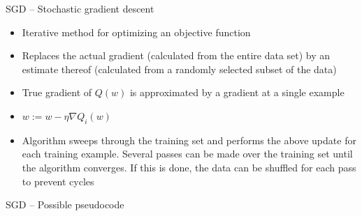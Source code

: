 \documentclass{beamer}{}
\begin{document}
\begin{frame} {SGD -- Stochastic gradient descent}
    \begin {itemize}[<+->]
        \item Iterative method for optimizing an objective function
        \item Replaces the actual gradient (calculated from the entire data set) by an estimate thereof (calculated from a randomly selected subset of the data)
        \item True gradient of $Q(w)$ is approximated by a gradient at a single example
        \item $w:=w - \eta \nabla Q_{i}(w)$
        \item Algorithm sweeps through the training set and performs the above update for each training example. Several passes can be made over the training set until the algorithm converges. If this is done, the data can be shuffled for each pass to prevent cycles
\end{itemize}
\end{frame}
\begin{frame} {SGD -- Possible pseudocode}
    \begin{center}
        \begin{minipage}[t]{.8\textwidth}
            \par
            \par
            \par
            \par
        \end{minipage}
        \end{center}
        
\end{frame}
\end{document}
